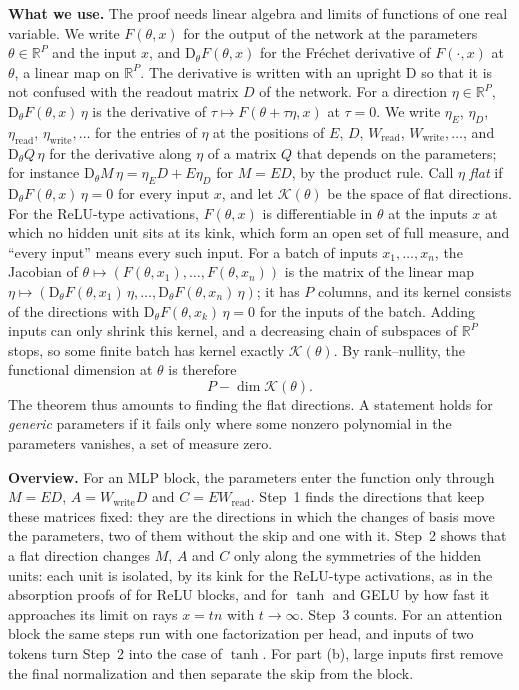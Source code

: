 \documentclass[10pt]{article}
\theoremstyle{definition}
\theoremstyle{remark}
\newcommand{\R}{\mathbb{R}}
\newcommand{\Wread}{W_{\mathrm{read}}}
\newcommand{\Wwrite}{W_{\mathrm{write}}}
\newcommand{\Der}{\mathrm{D}}
\newcommand{\para}[1]{\smallskip\noindent\textbf{#1}\hspace{0.5em}}
\begin{document}
\para{What we use.} The proof needs linear algebra and limits of functions of one real variable. We write $F(\theta, x)$ for the output of the network at the parameters $\theta \in \R^P$ and the input $x$, and $\Der_\theta F(\theta, x)$ for the Fr\'echet derivative of $F(\cdot, x)$ at $\theta$, a linear map on $\R^P$. The derivative is written with an upright $\Der$ so that it is not confused with the readout matrix $D$ of the network. For a direction $\eta \in \R^P$, $\Der_\theta F(\theta, x)\,\eta$ is the derivative of $\tau \mapsto F(\theta + \tau\eta, x)$ at $\tau = 0$. We write $\eta_E$, $\eta_D$, $\eta_{\mathrm{read}}$, $\eta_{\mathrm{write}}, \dots$ for the entries of $\eta$ at the positions of $E$, $D$, $\Wread$, $\Wwrite, \dots$, and $\Der_\theta Q\,\eta$ for the derivative along $\eta$ of a matrix $Q$ that depends on the parameters; for instance $\Der_\theta M\,\eta = \eta_ED + E\eta_D$ for $M = ED$, by the product rule. Call $\eta$ \emph{flat} if $\Der_\theta F(\theta, x)\,\eta = 0$ for every input $x$, and let $\mathcal K(\theta)$ be the space of flat directions. For the ReLU-type activations, $F(\theta, x)$ is differentiable in $\theta$ at the inputs $x$ at which no hidden unit sits at its kink, which form an open set of full measure, and ``every input'' means every such input. For a batch of inputs $x_1, \dots, x_n$, the Jacobian of $\theta \mapsto (F(\theta, x_1), \dots, F(\theta, x_n))$ is the matrix of the linear map $\eta \mapsto (\Der_\theta F(\theta, x_1)\,\eta, \dots, \Der_\theta F(\theta, x_n)\,\eta)$; it has $P$ columns, and its kernel consists of the directions with $\Der_\theta F(\theta, x_k)\,\eta = 0$ for the inputs of the batch. Adding inputs can only shrink this kernel, and a decreasing chain of subspaces of $\R^P$ stops, so some finite batch has kernel exactly $\mathcal K(\theta)$. By rank--nullity, the functional dimension at $\theta$ is therefore
\[
P - \dim\mathcal K(\theta).
\]
The theorem thus amounts to finding the flat directions. A statement holds for \emph{generic} parameters if it fails only where some nonzero polynomial in the parameters vanishes, a set of measure zero.

\para{Overview.} For an MLP block, the parameters enter the function only through $M = ED$, $A = \Wwrite D$ and $C = E\Wread$. Step~1 finds the directions that keep these matrices fixed: they are the directions in which the changes of basis move the parameters, two of them without the skip and one with it. Step~2 shows that a flat direction changes $M$, $A$ and $C$ only along the symmetries of the hidden units: each unit is isolated, by its kink for the ReLU-type activations, as in the absorption proofs of \citet{mijoski2026absorb} for ReLU blocks, and for $\tanh$ and GELU by how fast it approaches its limit on rays $x = tn$ with $t \to \infty$. Step~3 counts. For an attention block the same steps run with one factorization per head, and inputs of two tokens turn Step~2 into the case of $\tanh$. For part (b), large inputs first remove the final normalization and then separate the skip from the block.
\end{document}
